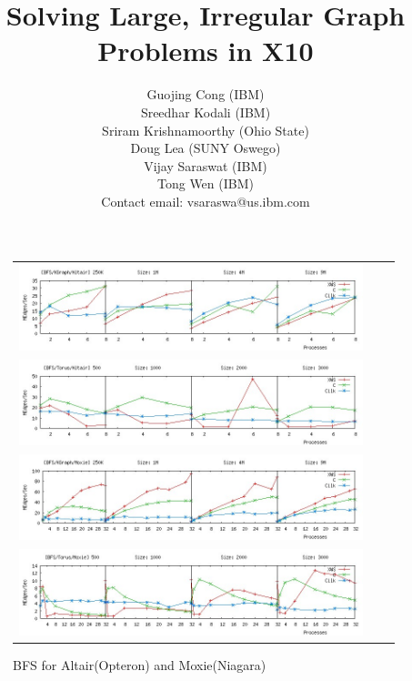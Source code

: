 \documentclass[10pt]{ieee}
\numberwithin{equation}{section}
\def\Xten{{\sf X10}}
\begin{document}
\title{Solving Large, Irregular Graph Problems in \Xten}

\author{
Guojing Cong (IBM)\\ 
Sreedhar Kodali (IBM)\\
Sriram Krishnamoorthy (Ohio State) \\
Doug Lea (SUNY Oswego)\\
Vijay Saraswat (IBM)\\
Tong Wen (IBM)\\
Contact email: vsaraswa@us.ibm.com\\ 
}

\date{}

\maketitle
\thispagestyle{empty}




%

%



%
%
%
{\footnotesize


}
\onecolumn
\begin{figure}
 \begin{tabular}{ccc}
 \includegraphics[width=10cm]{bfs-kgraph-altair-color.jpg} \\
 \includegraphics[width=10cm] {bfs-torus-altair-color.jpg} \\
\includegraphics[width=10cm]{bfs-kgraph-moxie-color.jpg} \\
\includegraphics[width=10cm]{bfs-torus-moxie-color.jpg}
 \end{tabular}
\caption{BFS for Altair(Opteron) and Moxie(Niagara)}\label{DFS-altair}\label{BFS-altair}
\end{figure}
\twocolumn
\end{document}
